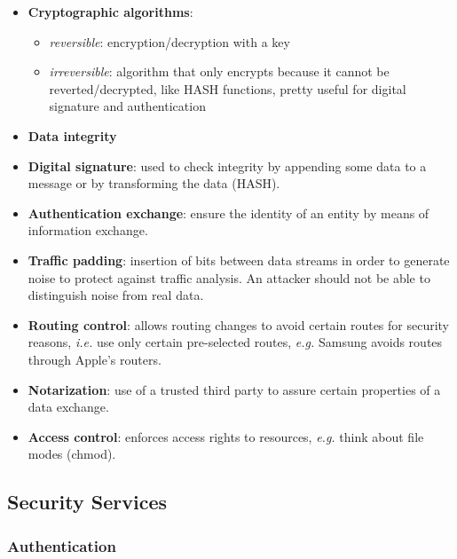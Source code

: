 \documentclass[oneside]{academica}
\begin{document}
\begin{itemize}
  \item \textbf{Cryptographic algorithms}:
    \begin{itemize}
      \item \textit{reversible}: encryption/decryption with a key
      \item \textit{irreversible}: algorithm that only encrypts because it cannot be reverted/decrypted, like HASH functions, pretty useful for digital signature and authentication
    \end{itemize}
  \item \textbf{Data integrity}
  \item \textbf{Digital signature}: used to check integrity by appending some data to a message or by transforming the data (HASH).
  \item \textbf{Authentication exchange}: ensure the identity of an entity by means of information exchange.
  \item \textbf{Traffic padding}: insertion of bits between data streams in order to generate noise to protect against traffic analysis. An attacker should not be able to distinguish noise from real data.
  \item \textbf{Routing control}: allows routing changes to avoid certain routes for security reasons, \textit{i.e.} use only certain pre-selected routes, \textit{e.g.} Samsung avoids routes through Apple's routers.
  \item \textbf{Notarization}: use of a trusted third party to assure certain properties of a data exchange.
  \item \textbf{Access control}: enforces access rights to resources, \textit{e.g.} think about file modes (chmod).
\end{itemize}

\subsection{Security Services}

\subsubsection{Authentication}
\end{document}
